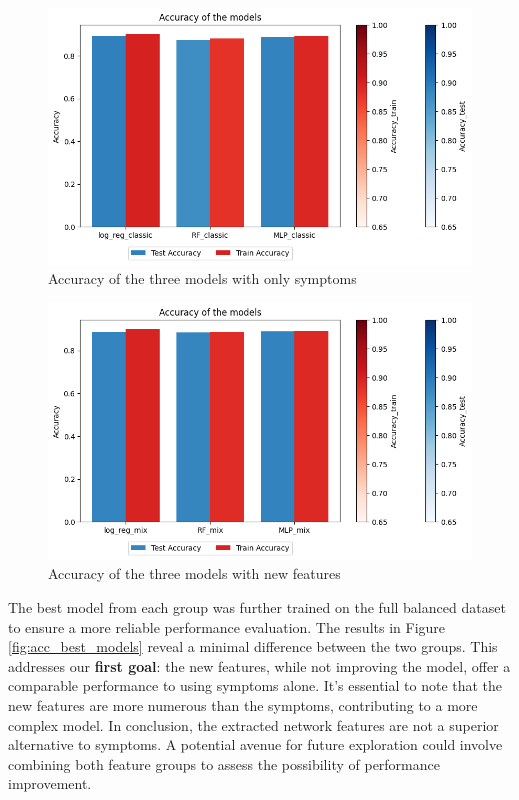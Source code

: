 	\begin{figure}[H]
		\centering
		\includegraphics[width=\columnwidth]{images/acc_symptoms.png}
		\caption{Accuracy of the three models with only symptoms}
		\label{fig:acc_symptoms}
	\end{figure}
	
	\begin{figure}[H]
		\centering
		\includegraphics[width=\columnwidth]{images/acc_new_features.png}
		\caption{Accuracy of the three models with new features}
		\label{fig:acc_new_features}
	\end{figure}
	
	\noindent
	The best model from each group was further trained on the full balanced dataset to ensure a more reliable 
	performance evaluation. The results in Figure \ref{fig:acc_best_models} reveal a minimal difference between 
	the two groups. This addresses our \textbf{first goal}: the new features, while not improving the model, 
	offer a comparable performance to using symptoms alone. It's essential to note that the new features are 
	more numerous than the symptoms, contributing to a more complex model. In conclusion, the extracted network 
	features are not a superior alternative to symptoms. A potential avenue for future exploration could involve 
	combining both feature groups to assess the possibility of performance improvement.
	
